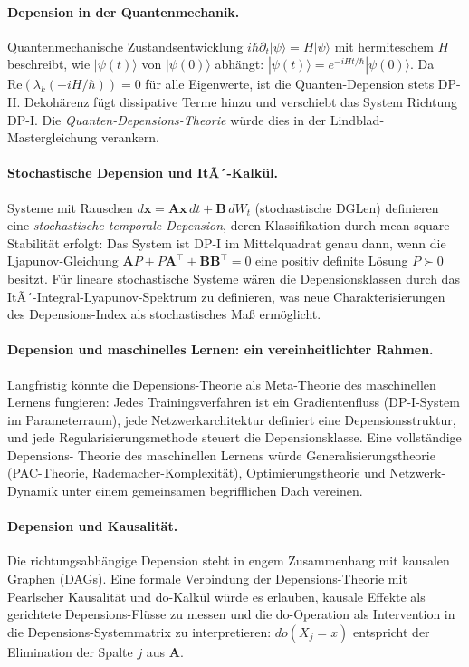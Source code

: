 ﻿\documentclass[12pt, a4paper]{article}
\theoremstyle{definition}
\theoremstyle{remark}
\newcommand{\vx}{\bm{x}}
\newcommand{\vA}{\bm{A}}
\newcommand{\vB}{\bm{B}}
\newcommand{\T}{\top}
\newcommand{\re}{\mathrm{Re}}
\begin{document}
\paragraph{Depension in der Quantenmechanik.}
Quantenmechanische Zustandsentwicklung $i\hbar\partial_t|\psi\rangle = H|\psi\rangle$
mit hermiteschem $H$ beschreibt, wie $|\psi(t)\rangle$ von $|\psi(0)\rangle$ abhängt:
$|\psi(t)\rangle = e^{-iHt/\hbar}|\psi(0)\rangle$. Da $\re(\lambda_k({-}iH/\hbar))=0$
für alle Eigenwerte, ist die Quanten-Depension stets DP-II. Dekohärenz
fügt dissipative Terme hinzu und verschiebt das System Richtung DP-I.
Die \emph{Quanten-Depensions-Theorie} würde dies in der
Lindblad-Mastergleichung verankern.

\paragraph{Stochastische Depension und ItÃ´-Kalkül.}
Systeme mit Rauschen $d\vx = \vA\vx\,dt + \vB\,dW_t$ (stochastische DGLen) definieren
eine \emph{stochastische temporale Depension}, deren Klassifikation durch
mean-square-Stabilität erfolgt: Das System ist DP-I im Mittelquadrat genau dann, wenn
die Ljapunov-Gleichung $\vA P + P\vA^\T + \vB\vB^\T = 0$ eine positiv definite Lösung
$P \succ 0$ besitzt. Für lineare stochastische Systeme wären die Depensionsklassen
durch das ItÃ´-Integral-Lyapunov-Spektrum zu definieren, was neue Charakterisierungen
des Depensions-Index als stochastisches Maß ermöglicht.

\paragraph{Depension und maschinelles Lernen: ein vereinheitlichter Rahmen.}
Langfristig könnte die Depensions-Theorie als Meta-Theorie des maschinellen Lernens
fungieren: Jedes Trainingsverfahren ist ein Gradientenfluss (DP-I-System im
Parameterraum), jede Netzwerkarchitektur definiert eine Depensionsstruktur, und jede
Regularisierungsmethode steuert die Depensionsklasse. Eine vollständige Depensions-
Theorie des maschinellen Lernens würde Generalisierungstheorie (PAC-Theorie,
Rademacher-Komplexität), Optimierungstheorie und Netzwerk-Dynamik unter einem
gemeinsamen begrifflichen Dach vereinen.

\paragraph{Depension und Kausalität.}
Die richtungsabhängige Depension steht in engem Zusammenhang mit kausalen Graphen
(DAGs). Eine formale Verbindung der Depensions-Theorie mit Pearlscher Kausalität und
do-Kalkül würde es erlauben, kausale Effekte als gerichtete Depensions-Flüsse zu
messen und die do-Operation als Intervention in die Depensions-Systemmatrix zu
interpretieren: $do(X_j = x)$ entspricht der Elimination der Spalte $j$ aus $\vA$.
\end{document}
